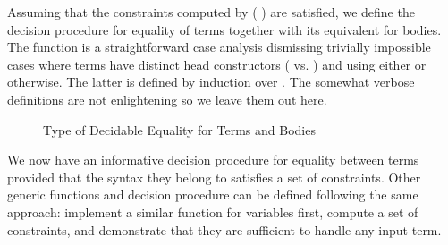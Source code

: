 Assuming that the constraints computed by {( )} are
satisfied, we define the decision procedure for equality of terms together
with its equivalent for bodies. The function 
is a straightforward case analysis dismissing trivially impossible cases
where terms have distinct head constructors ( vs. )
and using either  or 
otherwise. The latter is defined by induction over . The somewhat
verbose definitions are not enlightening so we leave them out here.


\begin{figure}[h]
\caption{Type of Decidable Equality for Terms and Bodies}\label{fig:eqtype}
\end{figure}

We now have an informative decision procedure for equality between terms
provided that the syntax they belong to satisfies a set of constraints.
Other generic functions and decision procedure can be defined
following the same approach: implement a similar function for variables
first, compute a set of constraints, and demonstrate that they are
sufficient to handle any input term.
